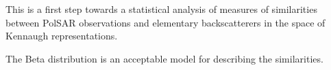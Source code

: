 \documentclass[conference]{IEEEtran}
\begin{document}
This is a first step towards a statistical analysis of measures of similarities between PolSAR observations and elementary backscatterers in the space of Kennaugh representations.

The Beta distribution is an acceptable model for describing the similarities.

%
%
%



\end{document}

